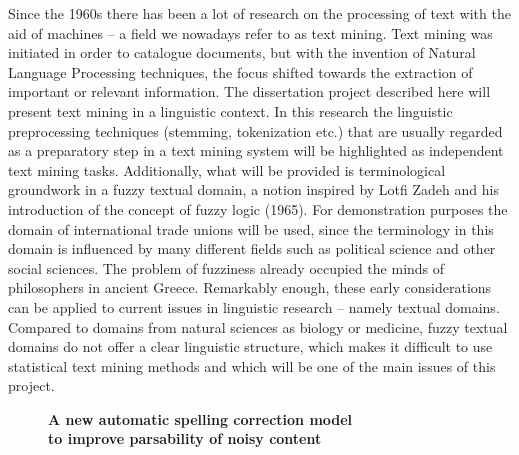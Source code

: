 \documentclass[10pt, a4paper, twopage, headinclude, footinclude, BCOR5mm]{scrartcl}
\begin{document}
        \begin{table}[t!]
    \end{table}

\noindent
Since the 1960s there has been a lot of research on the processing of text with the aid of machines – a field we nowadays refer to as text mining. Text mining was initiated in order to catalogue documents, but with the invention of Natural Language Processing techniques, the focus shifted towards the extraction of important or relevant information.  The dissertation project described here will present text mining in a linguistic context. In this research the linguistic preprocessing techniques (stemming, tokenization etc.) that are usually regarded as a preparatory step in a text mining system will be highlighted as independent text mining tasks. Additionally, what will be provided is terminological groundwork in a fuzzy textual domain, a notion inspired by Lotfi Zadeh and his introduction of the concept of fuzzy logic (1965). For demonstration purposes the domain of international trade unions will be used, since the terminology in this domain is influenced by many different fields such as political science and other social sciences. The problem of fuzziness already occupied the minds of philosophers in ancient Greece. Remarkably enough, these early considerations can be applied to current issues in linguistic research – namely textual domains. Compared to domains from natural sciences as biology or medicine, fuzzy textual domains do not offer a clear linguistic structure, which makes it difficult to use statistical text mining methods and which will be one of the main issues of this project. 


\newpage

\begin{figure}[t!]
\centering
\large\textbf{A new automatic spelling correction model \\ to improve parsability of noisy content}
\vspace*{0.5cm}
\end{figure}
\end{document}
